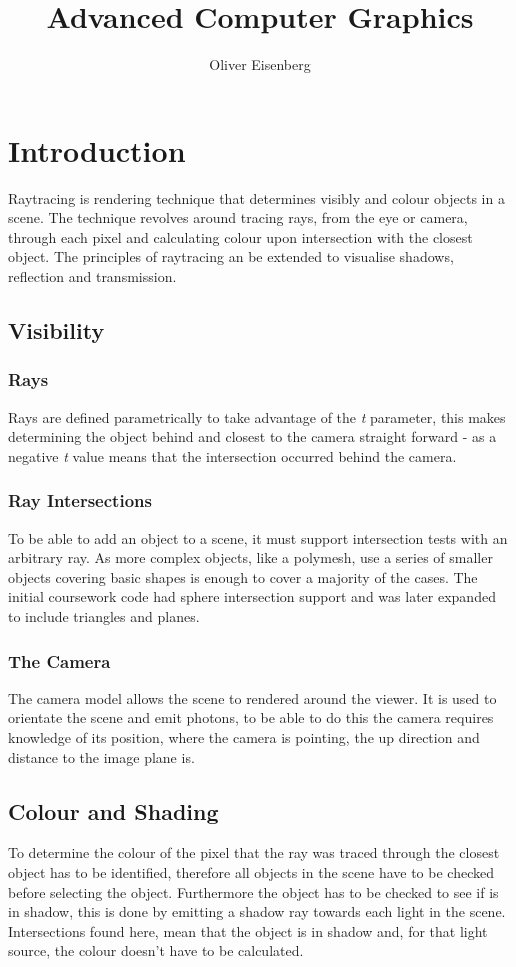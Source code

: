 \documentclass{article}
\begin{document}
\title{Advanced Computer Graphics}
\author{Oliver Eisenberg}
\maketitle
\tableofcontents
\twocolumn

\section{Introduction}
Raytracing is rendering technique that determines visibly and colour objects in a scene. The technique revolves around tracing rays, from the eye or camera, through each pixel and calculating colour upon intersection with the closest object. The principles of raytracing an be extended to visualise shadows, reflection and transmission. 

\subsection{Visibility}
\subsubsection{Rays}
Rays are defined parametrically to take advantage of the \textit{t} parameter, this makes determining the object behind and closest to the camera straight forward - as a negative \textit{t} value means that the intersection occurred behind the camera.

\subsubsection{Ray Intersections}
To be able to add an object to a scene, it must support intersection tests with an arbitrary ray. As more complex objects, like a polymesh, use a series of smaller objects covering basic shapes is enough to cover a majority of the cases. The initial coursework code had sphere intersection support and was later expanded to include triangles and planes.
\subsubsection{The Camera}
The camera model allows the scene to rendered around the viewer. It is used to orientate the scene and emit photons, to be able to do this the camera requires knowledge of its position, where the camera is pointing, the up direction and distance to the image plane is.
\subsection{Colour and Shading}
To determine the colour of the pixel that the ray was traced through the closest object has to be identified, therefore all objects in the scene have to be checked before selecting the object. Furthermore the object has to be checked to see if is in shadow, this is done by emitting a shadow ray towards each light in the scene. Intersections found here, mean that the object is in shadow and, for that light source, the colour doesn't have to be calculated. 
\end{document}
